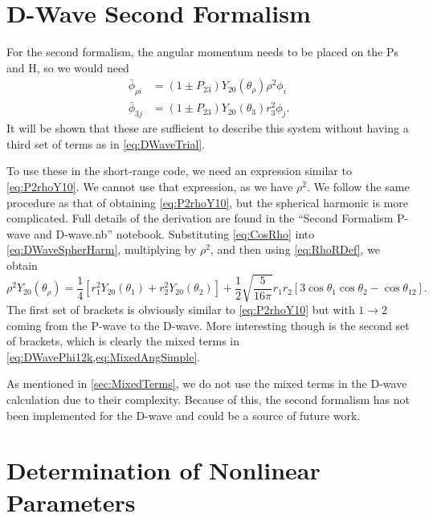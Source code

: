 \documentclass[Dissertation.tex]{subfiles}
\begin{document}


\section{D-Wave Second Formalism}
\label{sec:DSecondForm}
For the second formalism, the angular momentum needs to be placed on the Ps and H, so we would need
\begin{subequations}
\label{eq:DWave2ndPhiBar}
\begin{align}
\bar{\phi}_{\rho i} &= \left(1 \pm P_{23}\right) Y_{20}(\theta_\rho) \rho^2 \phi_i \label{eq:DWave2ndPhi1i}\\
\bar{\phi}_{3j} &= \left(1 \pm P_{23}\right) Y_{20}(\theta_3) r_3^2 \phi_j \label{eq:DWave2ndPhi2j}.
\end{align}
\end{subequations}
It will be shown that these are sufficient to describe this system without 
having a third set of terms as in \cref{eq:DWaveTrial}.

To use these in the short-range code, we need an expression similar to
\cref{eq:P2rhoY10}. We cannot use that expression, as we have $\rho^2$. We
follow the same procedure as that of obtaining \cref{eq:P2rhoY10}, but the
spherical harmonic is more complicated. Full details of the derivation are
found in the ``Second Formalism P-wave and D-wave.nb'' notebook.
Substituting \cref{eq:CosRho} into \cref{eq:DWaveSpherHarm}, multiplying by
$\rho^2$, and then using \cref{eq:RhoRDef}, we obtain
\begin{equation}
\label{eq:rhoident2}
\rho^2 Y_{20}(\theta_\rho) = \frac{1}{4} \left[r_1^2 Y_{20}(\theta_1) + r_2^2 Y_{20}(\theta_2) \right] + \frac{1}{2} \sqrt{\frac{5}{16 \pi}} 
   r_1 r_2 \left[3 \cos\theta_1 \cos\theta_2 - \cos\theta_{12} \right].
\end{equation}
The first set of brackets is obviously similar to \cref{eq:P2rhoY10} but with
$1 \to 2$ coming from the P-wave to the D-wave. More interesting though is the
second set of brackets, which is clearly the mixed terms in
\cref{eq:DWavePhi12k,eq:MixedAngSimple}.

As mentioned in \cref{sec:MixedTerms}, we do not use the mixed terms in the
D-wave calculation due to their complexity. Because of this, the second
formalism has not been implemented for the D-wave and could be a source of
future work.


\section{Determination of Nonlinear Parameters}
\label{sec:DWaveNonlinear}
\end{document}
